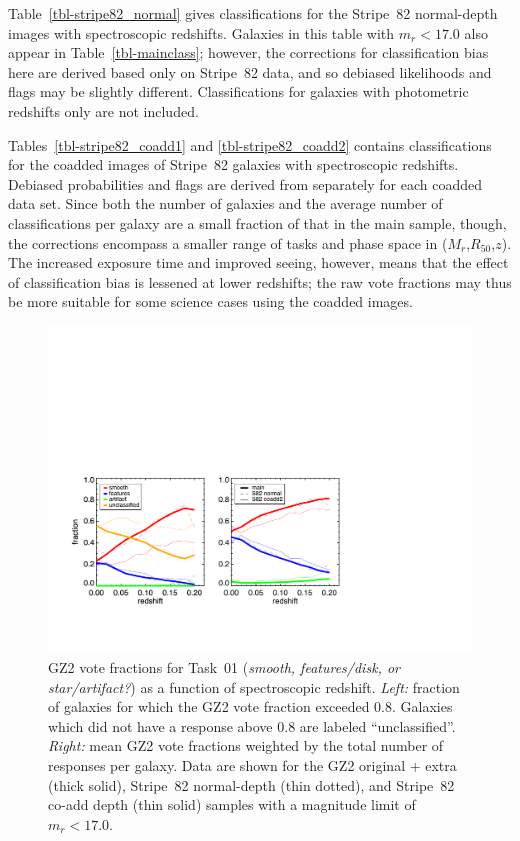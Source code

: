 \documentclass[useAMS,usenatbib]{mn2e}
\newcommand{\mr}{$M_r$}
\newcommand{\rfifty}{$R_{50}$}
\newcommand{\redshift}{$z$}
\begin{document}
Table~\ref{tbl-stripe82_normal} gives classifications for the Stripe~82 normal-depth images with spectroscopic redshifts. Galaxies in this table with $m_r < 17.0$ also appear in Table~\ref{tbl-mainclass}; however, the corrections for classification bias here are derived based only on Stripe~82 data, and so debiased likelihoods and flags may be slightly different. Classifications for galaxies with photometric redshifts only are not included.

Tables~\ref{tbl-stripe82_coadd1} and \ref{tbl-stripe82_coadd2} contains classifications for the coadded images of Stripe~82 galaxies with spectroscopic redshifts. Debiased probabilities and flags are derived from separately for each coadded data set. Since both the number of galaxies and the average number of classifications per galaxy are a small fraction of that in the main sample, though, the corrections encompass a smaller range of tasks and phase space in (\mr,\rfifty,\redshift). The increased exposure time and improved seeing, however, means that the effect of classification bias is lessened at lower redshifts; the raw vote fractions may thus be more suitable for some science cases using the coadded images. 

\begin{figure}
\includegraphics[angle=0,width=7.0in]{figures/gz2_bias_demo_task01.pdf}
\caption{GZ2 vote fractions for Task~01 ({\it smooth, features/disk, or star/artifact?}) as a function of spectroscopic redshift. {\it Left:} fraction of galaxies for which the GZ2 vote fraction exceeded 0.8. Galaxies which did not have a response above 0.8 are labeled ``unclassified''. {\it Right:} mean GZ2 vote fractions weighted by the total number of responses per galaxy. Data are shown for the GZ2 original + extra (thick solid), Stripe~82 normal-depth (thin dotted), and Stripe~82 co-add depth (thin solid) samples with a magnitude limit of $m_r < 17.0$.
\label{fig-task01}}
\end{figure}
\end{document}
